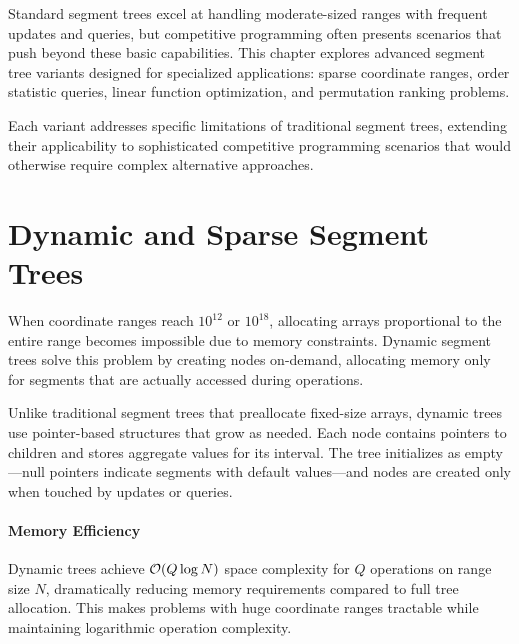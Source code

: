\label{chap:specialised_variants}

Standard segment trees excel at handling moderate-sized ranges with frequent updates and queries, but competitive programming often presents scenarios that push beyond these basic capabilities. This chapter explores advanced segment tree variants designed for specialized applications: sparse coordinate ranges, order statistic queries, linear function optimization, and permutation ranking problems.

Each variant addresses specific limitations of traditional segment trees, extending their applicability to sophisticated competitive programming scenarios that would otherwise require complex alternative approaches.

\section{Dynamic and Sparse Segment Trees}
\label{sec:dynamic_sparse}

When coordinate ranges reach $10^{12}$ or $10^{18}$, allocating arrays proportional to the entire range becomes impossible due to memory constraints. Dynamic segment trees solve this problem by creating nodes on-demand, allocating memory only for segments that are actually accessed during operations.

Unlike traditional segment trees that preallocate fixed-size arrays, dynamic trees use pointer-based structures that grow as needed. Each node contains pointers to children and stores aggregate values for its interval. The tree initializes as empty—null pointers indicate segments with default values—and nodes are created only when touched by updates or queries.


\paragraph{Memory Efficiency}

Dynamic trees achieve $\mathcal{O}(Q \log N)$ space complexity for $Q$ operations on range size $N$, dramatically reducing memory requirements compared to full tree allocation. This makes problems with huge coordinate ranges tractable while maintaining logarithmic operation complexity.

